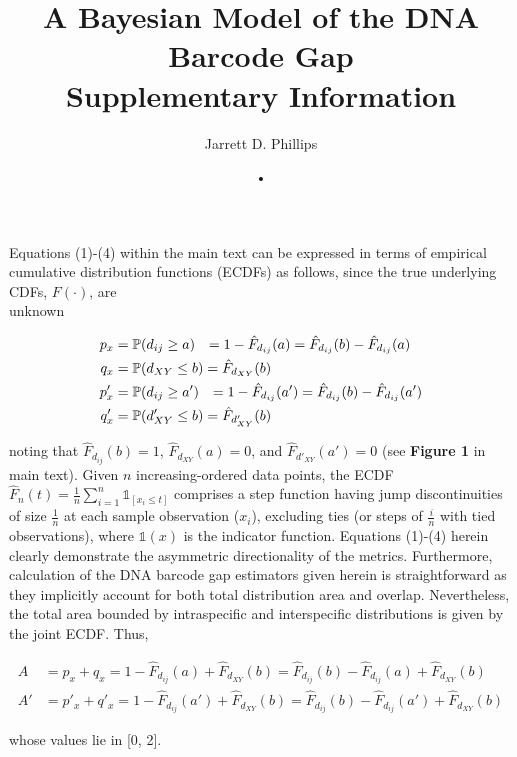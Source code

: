 \documentclass[12pt]{article}
\begin{document}
\title{A Bayesian Model of the DNA Barcode Gap \\ \vspace{5mm} Supplementary Information}

\author{Jarrett D. Phillips}

\date{•}

\maketitle


Equations (1)-(4) within the main text can be expressed in terms of empirical cumulative distribution functions (ECDFs) as follows, since the true underlying CDFs, $F(\cdot)$, are \\ unknown

\begin{align}
p_x &= \mathbb{P}(d_{ij} \geq a) \hspace{2.5mm} = 1 - \hat{F}_{d_{ij}}(a) = \hat{F}_{d_{ij}}(b) - \hat{F}_{d_{ij}}(a)  \\
q_x &= \mathbb{P}(d_{XY} \leq b) = \hat{F}_{d_{XY}}(b) \\
p'_x &= \mathbb{P}(d_{ij} \geq a') \hspace{2.5mm} = 1 - \hat{F}_{d_{ij}}(a') = \hat{F}_{d_{ij}}(b) - \hat{F}_{d_{ij}}(a') \\
q'_x &= \mathbb{P}(d'_{XY} \leq b) = \hat{F}_{d'_{XY}}(b)
\end{align}

\noindent noting that $\hat{F}_{d_{ij}}(b) = 1$, $\hat{F}_{d_{XY}}(a) = 0$, and $\hat{F}_{d'_{XY}}(a') = 0$ (see \textbf{Figure 1} in main text). Given $n$ increasing-ordered data points, the ECDF $\hat{F}_n(t) = \frac{1}{n}\sum_{i = 1}^n\mathds{1}_{[x_i \leq t]}$ comprises a step function having jump discontinuities of size $\frac{1}{n}$ at each sample observation ($x_i$), excluding ties (or steps of $\frac{i}{n}$ with tied observations), where $\mathds{1}(x)$ is the indicator function. Equations (1)-(4) herein clearly demonstrate the asymmetric directionality of the metrics. Furthermore, calculation of the DNA barcode gap estimators given herein is straightforward as they implicitly account for both total distribution area and overlap. Nevertheless, the total area bounded by intraspecific and interspecific distributions is given by the joint ECDF. Thus,

\begin{align}
A &= p_x + q_x = 1 - \hat{F}_{d_{ij}}(a) + \hat{F}_{d_{XY}}(b) = \hat{F}_{d_{ij}}(b) - \hat{F}_{d_{ij}}(a) + \hat{F}_{d_{XY}}(b) \\
A' &= p'_x + q'_x = 1 - \hat{F}_{d_{ij}}(a') + \hat{F}_{d_{XY}}(b) = \hat{F}_{d_{ij}}(b) - \hat{F}_{d_{ij}}(a') + \hat{F}_{d_{XY}}(b)
\end{align}

\noindent whose values lie in [0, 2].
\end{document}
